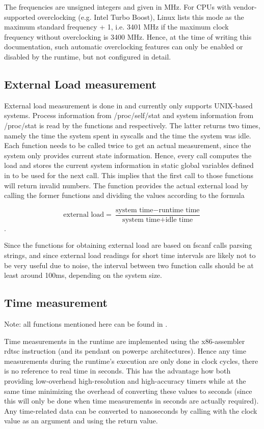 The frequencies are unsigned integers and given in MHz. For CPUs with vendor-supported overclocking (e.g. Intel Turbo Boost), Linux lists this mode as the maximum standard frequency + 1, i.e. 3401 MHz if the maximum clock frequency without overclocking is 3400 MHz. Hence, at the time of writing this documentation, such automatic overclocking features can only be enabled or disabled by the runtime, but not configured in detail.

\subsection{External Load measurement}

External load measurement is done in  and currently only supports UNIX-based systems. Process information from
/proc/self/stat and system information from /proc/stat is read by the functions
 and  respectively.
The latter returns two times, namely the time the system spent in syscalls and
the time the system was idle. Each function needs to be called twice to get an
actual measurement, since the system only provides current state information.
Hence, every call computes the load and stores the current system information
in static global variables defined in  to be used for the next
call. This implies that the first call to those functions will return invalid
numbers. The function  provides the actual
external load by calling the former functions and dividing the values according
to the formula

\[ \text{external load} = \frac{\text{system time} - \text{runtime
time}}{\text{system time} + \text{idle time}} \].

Since the functions for obtaining external load are based on fscanf calls
parsing strings, and since external load readings for short time intervals are
likely not to be very useful due to noise, the interval between two
 function calls should be at least around
100ms, depending on the system size.

\subsection{Time measurement} 
\label{sec:runtime.abstraction.time.measurement}

Note: all functions mentioned here can be found in .


Time measurements in the runtime are implemented using the x86-assembler rdtsc
instruction (and its pendant on powerpc architectures). Hence any time
measurements during the runtime's execution are only done in clock cycles, there
is no reference to real time in seconds. This has the advantage how both
providing low-overhead high-resolution and high-accuracy timers while at the
same time minimizing the overhead of converting these values to seconds (since
this will only be done when time measurements in seconds are actually required).
Any time-related data can be converted to nanoseconds by calling
 with the clock value as an
argument and using the return value.

